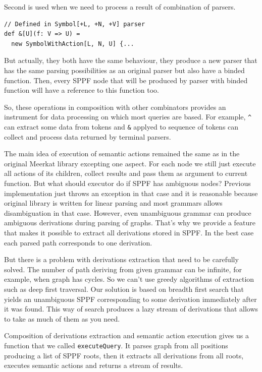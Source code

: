 Second is used when we need to process a result of combination of parsers.
\begin{lstlisting}
// Defined in Symbol[+L, +N, +V] parser
def &[U](f: V => U) = 
  new SymbolWithAction[L, N, U] {...
\end{lstlisting}

But actually, they both have the same behaviour, they produce a new parser that has the same parsing possibilities as an original parser but also have a binded function.
Then, every SPPF node that will be produced by parser with binded function will have a reference to this function too.

So, these operations in composition with other combinators provides an instrument for data processing on which most queries are based. 
For example, \lstinline{^} can extract some data from tokens and \lstinline{&} applyed to sequence of tokens can collect and process data returned by terminal parsers.

The main idea of execution of semantic actions remained the same as in the original Meerkat library excepting one aspect.
For each node we still just execute all actions of its children, collect results and pass them as argument to current function.
But what should executor do if SPPF has ambiguous nodes? 
Previous implementation just throws an exception in that case and it is reasonable because 
original library is written for linear parsing and most grammars allows disambiguation in that case.
However, even unambiguous grammar can produce ambiguous derivations during parsing of graphs.
That's why we provide a feature that makes it possible to extract all derivations stored in SPPF.
In the best case each parsed path corresponds to one derivation.

But there is a problem with derivations extraction that need to be carefully solved.
The number of path deriving from given grammar can be infinite, for example, when graph has cycles.
So we can't use greedy algorithms of extraction such as deep first traversal.
Our solution is based on breadth first search that yields an unambiguous SPPF corresponding to some derivation immediately after it was found.
This way of search produces a lazy stream of derivations that allows to take as much of them as you need.

Composition of derivations extraction and semantic action execution gives us a function that we called
\lstinline{executeQuery}. It parses graph from all positions producing a list of SPPF roots, then it
extracts all derivations from all roots, executes semantic actions and returns a stream of results.